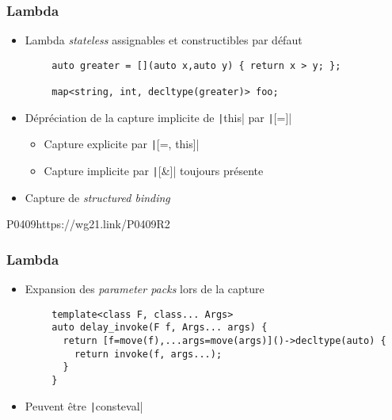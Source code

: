 \documentclass[C++.tex]{subfiles}
\begin{document}
\begin{frame}[fragile]
	\frametitle{Lambda}
	\begin{itemize}
		\item Lambda \textit{stateless} assignables et constructibles par défaut

	\end{itemize}

	\begin{verbatim}
		auto greater = [](auto x,auto y) { return x > y; };

		map<string, int, decltype(greater)> foo;
	\end{verbatim}

	\begin{itemize}
		\item Dépréciation de la capture implicite de \texttt|this| par \texttt|[=]|
		\begin{itemize}
			\item Capture explicite par \texttt|[=, this]|


			\item Capture implicite par \texttt|[&]| toujours présente
		\end{itemize}
		\item Capture de \textit{structured binding}
	\end{itemize}

		{P0409}{https://wg21.link/P0409R2}
\end{frame}

\begin{frame}[fragile]
	\frametitle{Lambda}
	\begin{itemize}
		\item Expansion des \textit{parameter packs} lors de la capture
	\end{itemize}

	\begin{verbatim}
		template<class F, class... Args>
		auto delay_invoke(F f, Args... args) {
		  return [f=move(f),...args=move(args)]()->decltype(auto) {
		    return invoke(f, args...); 
		  }
		}
	\end{verbatim}

	\begin{itemize}
		\item Peuvent être \texttt|consteval|
	\end{itemize}

\end{frame}
\end{document}
